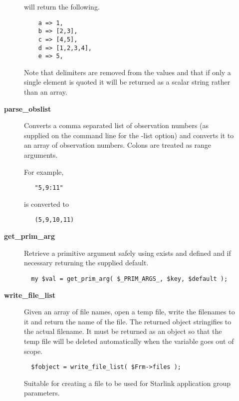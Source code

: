 \begin{description}
\begin{description}
will return the following.

\begin{verbatim}
    a => 1,
    b => [2,3],
    c => [4,5],
    d => [1,2,3,4],
    e => 5,
\end{verbatim}


Note that delimiters are removed from the values and that if only a
single element is quoted it will be returned as a scalar string rather
than an array.


\item[{\textbf{parse\_obslist}}] \mbox{}

Converts a comma separated list of observation numbers (as supplied
on the command line for the -list option) and converts it to
an array of observation numbers. Colons are treated as range arguments.



For example,

\begin{verbatim}
   "5,9:11"
\end{verbatim}


is converted to

\begin{verbatim}
   (5,9,10,11)
\end{verbatim}

\item[{\textbf{get\_prim\_arg}}] \mbox{}

Retrieve a primitive argument safely using exists and defined
and if necessary returning the supplied default.

\begin{verbatim}
  my $val = get_prim_arg( $_PRIM_ARGS_, $key, $default );
\end{verbatim}

\item[{\textbf{write\_file\_list}}] \mbox{}

Given an array of file names, open a temp file, write the filenames
to it and return the name of the file. The returned object stringifies
to the actual filename. It must be returned as an object so that
the temp file will be deleted automatically when the variable
goes out of scope.

\begin{verbatim}
  $fobject = write_file_list( $Frm->files );
\end{verbatim}


Suitable for creating a file to be used for Starlink application
group parameters.



\end{description}
\end{description}
